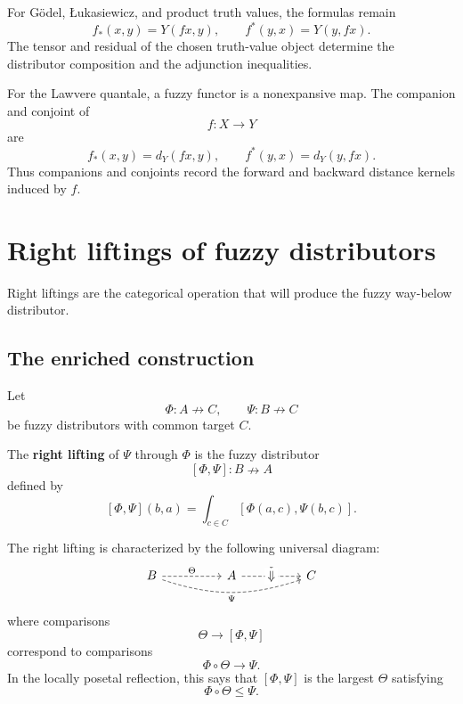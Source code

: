 \begin{example}
\label{ex:companions-standard}
For G\"odel, {\L}ukasiewicz, and product truth values, the formulas remain
\[
    f_\ast(x,y)=Y(fx,y),
    \qquad
    f^\ast(y,x)=Y(y,fx).
\]
The tensor and residual of the chosen truth-value object determine the distributor
composition and the adjunction inequalities.
\end{example}

\begin{example}
\label{ex:companions-lawvere}
For the Lawvere quantale, a fuzzy functor is a nonexpansive map. The companion
and conjoint of
\[
    f:X\to Y
\]
are
\[
    f_\ast(x,y)=d_Y(fx,y),
    \qquad
    f^\ast(y,x)=d_Y(y,fx).
\]
Thus companions and conjoints record the forward and backward distance kernels
induced by \(f\).
\end{example}

\section{Right liftings of fuzzy distributors}
\label{sec:right-liftings-fuzzy-distributors}

Right liftings are the categorical operation that will produce the fuzzy
way-below distributor.

\subsection{The enriched construction}
\label{subsec:right-liftings-enriched}

Let
\[
    \Phi:A\nrightarrow C,
    \qquad
    \Psi:B\nrightarrow C
\]
be fuzzy distributors with common target \(C\).

\begin{definition}
\label{def:right-lifting}
The \textbf{right lifting} of \(\Psi\) through \(\Phi\) is the fuzzy distributor
\[
    [\Phi,\Psi]:B\nrightarrow A
\]
defined by
\[
    [\Phi,\Psi](b,a)
    =
    \int_{c\in C}
    [\Phi(a,c),\Psi(b,c)].
\]
\end{definition}

The right lifting is characterized by the following universal diagram:
\[
\begin{tikzcd}[column sep=huge,row sep=large]
B
    \ar[r,dashed,"\Theta"]
    \ar[rr,bend right=18,dashed,"\Psi"']
&
A
    \ar[r,dashed,"\Phi"]
&
C
\ar[phantom,from=1-2,to=1-3,"\Downarrow" description]
\end{tikzcd}
\]
where comparisons
\[
    \Theta\to[\Phi,\Psi]
\]
correspond to comparisons
\[
    \Phi\circ\Theta\to\Psi.
\]
In the locally posetal reflection, this says that \([\Phi,\Psi]\) is the largest
\(\Theta\) satisfying
\[
    \Phi\circ\Theta\leq\Psi.
\]

